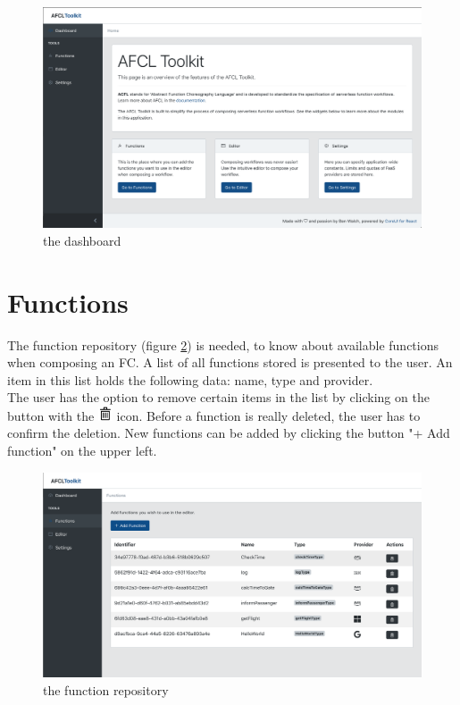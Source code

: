 \documentclass[a4paper,top=25mm,bottom=25mm,12pt,pdftex,halfparskip,twoside,openany,bibtotoc,numbers=noenddot]{scrbook}
\begin{document}
\begin{figure}[H]
  \centering
  \includegraphics[width=\textwidth]{dashboard}
  \caption{the dashboard}
  \label{fig:interface-dashboard}
\end{figure}

\section{Functions}

% 

The function repository (figure \ref{fig:interface-function-repository}) is needed, to know about available functions when composing an FC.  A list of all functions stored is presented to the user. An item in this list holds the following data: \textsf{name}, \textsf{type} and \textsf{provider}.\\
The user has the option to remove certain items in the list by clicking on the button with the \includegraphics[height=12pt]{editor-toolbar-trash.pdf} icon. Before a function is really deleted, the user has to confirm the deletion.
New functions can be added by clicking the button "+ Add function" on the upper left.

\begin{figure}[H]
  \centering
  \includegraphics[width=\textwidth]{functions}
  \caption{the function repository}
  \label{fig:interface-function-repository}
\end{figure}
\end{document}
